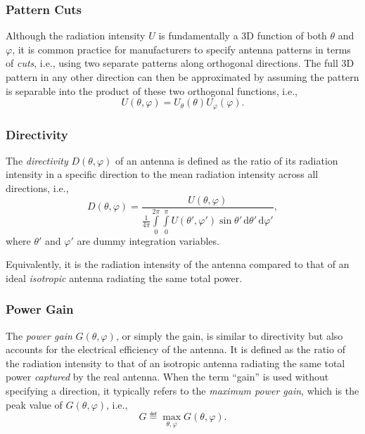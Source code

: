 \subsubsection{Pattern Cuts}

Although the radiation intensity $U$ is fundamentally a 3D function of both $\theta$ and $\varphi$, it is common practice for manufacturers to specify antenna patterns in terms of \emph{cuts}, i.e., using two separate patterns along orthogonal directions. The full 3D pattern in any other direction can then be approximated by assuming the pattern is separable into the product of these two orthogonal functions, i.e.,
\begin{equation}
  U(\theta, \varphi) = U_\theta(\theta) U_\varphi(\varphi).
\end{equation}

\subsubsection{Directivity}

The \emph{directivity} $D(\theta, \varphi)$ of an antenna is defined as the ratio of its radiation intensity in a specific direction to the mean radiation intensity across all directions, i.e.,
\begin{equation}
  D(\theta, \varphi) = \frac{U(\theta, \varphi)}{\frac{1}{4\pi}\int\limits_{0}^{2\pi}\int\limits_{0}^{\pi} U(\theta', \varphi')\sin\theta' \, \mathrm{d}\theta' \, \mathrm{d}\varphi'},
\end{equation}
where $\theta'$ and $\varphi'$ are dummy integration variables.

Equivalently, it is the radiation intensity of the antenna compared to that of an ideal \emph{isotropic} antenna radiating the same total power.

\subsubsection{Power Gain}

The \emph{power gain} $G(\theta, \varphi)$, or simply the gain, is similar to directivity but also accounts for the electrical efficiency of the antenna. It is defined as the ratio of the radiation intensity to that of an isotropic antenna radiating the same total power \emph{captured} by the real antenna. When the term \enquote{gain} is used without specifying a direction, it typically refers to the \emph{maximum power gain}, which is the peak value of $G(\theta, \varphi)$, i.e.,
\begin{equation}
  G \eqdef \max_{\theta, \varphi} G(\theta, \varphi).
\end{equation}

